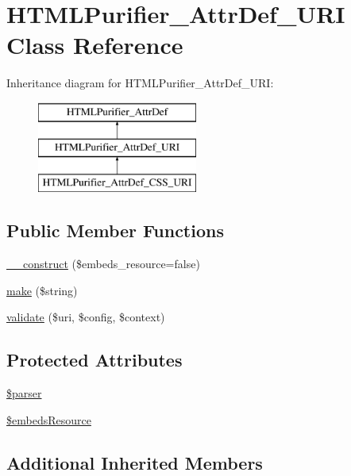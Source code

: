 \hypertarget{classHTMLPurifier__AttrDef__URI}{\section{H\+T\+M\+L\+Purifier\+\_\+\+Attr\+Def\+\_\+\+U\+R\+I Class Reference}
\label{classHTMLPurifier__AttrDef__URI}
}
Inheritance diagram for H\+T\+M\+L\+Purifier\+\_\+\+Attr\+Def\+\_\+\+U\+R\+I\+:\begin{figure}[H]
\begin{center}
\leavevmode
\includegraphics[height=3.000000cm]{classHTMLPurifier__AttrDef__URI}
\end{center}
\end{figure}
\subsection*{Public Member Functions}
\begin{DoxyCompactItemize}
\item 
\hyperlink{classHTMLPurifier__AttrDef__URI_a8007e76249d3fddb320dabfdd3abc858}{\+\_\+\+\_\+construct} (\$embeds\+\_\+resource=false)
\item 
\hyperlink{classHTMLPurifier__AttrDef__URI_af16c627201a453ea6aaf3add966e358d}{make} (\$string)
\item 
\hyperlink{classHTMLPurifier__AttrDef__URI_a25866f9117d08ef97a81d86662edc1fb}{validate} (\$uri, \$config, \$context)
\end{DoxyCompactItemize}
\subsection*{Protected Attributes}
\begin{DoxyCompactItemize}
\item 
\hyperlink{classHTMLPurifier__AttrDef__URI_a52a7426b1f733df5ec6474a5cd157178}{\$parser}
\item 
\hyperlink{classHTMLPurifier__AttrDef__URI_ac159995ddeb224f67ab5b87e523505e1}{\$embeds\+Resource}
\end{DoxyCompactItemize}
\subsection*{Additional Inherited Members}



